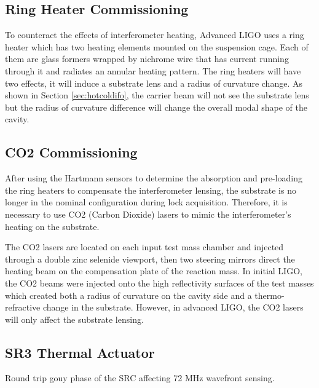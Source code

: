	\cite{Brooks_HWS_2007}
	
	\subsection{Ring Heater Commissioning}\label{Sec:RH}
	To counteract the effects of interferometer heating, Advanced LIGO uses a ring heater which has two heating elements mounted on the suspension cage. Each of them are glass formers wrapped by nichrome wire that has current running through it and radiates an annular heating pattern. The ring heaters will have two effects, it will induce a substrate lens and a radius of curvature change.  As shown in Section \ref{sec:hotcoldifo}, the carrier beam will not see the substrate lens but the radius of curvature difference will change the overall modal shape of the cavity. 
	
	\cite{ramette_analytical}
	
	\cite{wang_thermalmodel}
	
	\cite{winkler_thermaldist}
	
	
	\subsection{CO2 Commissioning}\label{Sec:CO2}
	After using the Hartmann sensors to determine the absorption and pre-loading the ring heaters to compensate the interferometer lensing, the substrate is no longer in the nominal configuration during lock acquisition.  Therefore, it is necessary to use CO2 (Carbon Dioxide) lasers to mimic the interferometer's heating on the substrate.
	
	The CO2 lasers are located on each input test mass chamber and injected through a double zinc selenide viewport, then two steering mirrors direct the heating beam on the compensation plate of the reaction mass.  In initial LIGO, the CO2 beams were injected onto the high reflectivity surfaces of the test masses which created both a radius of curvature on the cavity side and a thermo-refractive change in the substrate.  However, in advanced LIGO, the CO2 lasers will only affect the substrate lensing.
	
	\cite{hello_vinet}
	
	
	\subsection{SR3 Thermal Actuator}
	Round trip gouy phase of the SRC affecting 72 MHz wavefront sensing.
	
